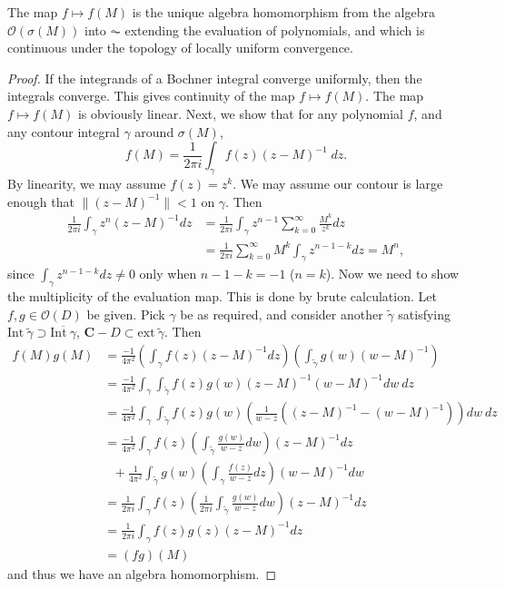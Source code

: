 \begin{theorem}
    The map $f \mapsto f(M)$ is the unique algebra homomorphism from the algebra $\mathcal{O}(\sigma(M))$ into $\AC$ extending the evaluation of polynomials, and which is continuous under the topology of locally uniform convergence.
\end{theorem}
\begin{proof}
    If the integrands of a Bochner integral converge uniformly, then the integrals converge. This gives continuity of the map $f \mapsto f(M)$. The map $f \mapsto f(M)$ is obviously linear. Next, we show that for any polynomial $f$, and any contour integral $\gamma$ around $\sigma(M)$,
    \[ f(M) = \frac{1}{2 \pi i} \int_\gamma f(z) (z - M)^{-1}\; dz. \]
    By linearity, we may assume $f(z) = z^k$. We may assume our contour is large enough that $\| (z - M)^{-1} \| < 1$ on $\gamma$. Then
    \begin{align*}
        \frac{1}{2 \pi i} \int_\gamma z^n (z - M)^{-1} dz &= \frac{1}{2 \pi i} \int_\gamma z^{n-1} \sum_{k = 0}^\infty \frac{M^k}{z^k} dz\\
        &= \frac{1}{2 \pi i} \sum_{k = 0}^\infty M^k \int_\gamma z^{n - 1 - k} dz = M^n,
    \end{align*}
    since $\int_\gamma z^{n-1-k} dz \neq 0$ only when $n - 1 - k = -1$ ($n = k$). Now we need to show the multiplicity of the evaluation map. This is done by brute calculation. Let $f,g \in \mathcal{O}(D)$ be given. Pick $\gamma$ be as required, and consider another $\tilde{\gamma}$ satisfying $\text{Int}\ \tilde{\gamma} \supset \overline{\text{Int}\ \gamma}$, $\mathbf{C} - D \subset \text{ext}\ \tilde{\gamma}$. Then
    \begin{align*}
        f(M) g(M) &= \frac{-1}{4 \pi^2} \left( \int_\gamma f(z) (z - M)^{-1} dz \right) \left( \int_{\tilde{\gamma}} g(w) (w - M)^{-1} \right)\\
        &= \frac{-1}{4 \pi^2} \int_\gamma \int_{\tilde{\gamma}} f(z) g(w) (z - M)^{-1} (w - M)^{-1} dw\ dz\\
        &= \frac{-1}{4 \pi^2} \int_\gamma \int_{\tilde{\gamma}} f(z) g(w) \left( \frac{1}{w - z} \left((z - M)^{-1} - (w - M)^{-1} \right) \right) dw\ dz\\
        &= \frac{-1}{4 \pi^2} \int_\gamma f(z) \left( \int_{\tilde{\gamma}} \frac{g(w)}{w - z} dw \right) (z - M)^{-1} dz\\
        &\ \ \ + \frac{1}{4 \pi^2} \int_{\tilde{\gamma}} g(w) \left( \int_\gamma \frac{f(z)}{w - z} dz \right) (w - M)^{-1} dw\\
        &= \frac{1}{2 \pi i} \int_\gamma f(z) \left( \frac{1}{2 \pi i} \int_{\tilde{\gamma}} \frac{g(w)}{w - z} dw \right) (z - M)^{-1} dz\\
        &= \frac{1}{2 \pi i} \int_\gamma f(z) g(z) (z - M)^{-1} dz\\
        &= (fg)(M)
    \end{align*}
    and thus we have an algebra homomorphism.


\end{proof}
